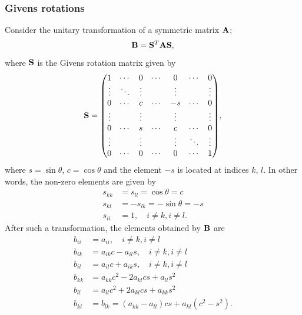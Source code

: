 \documentclass[notitlepage, reprint, nofootinbib]{revtex4-1}
\begin{document}
\subsubsection{Givens rotations}\label{givens}
Consider the unitary transformation of a symmetric matrix $\vb{A}$;
\begin{equation} \label{rotation}\vb{B}=\vb{S}^T\vb{AS},\end{equation}
where $\vb{S}$ is the Givens rotation matrix given by 
\begin{equation}\label{givens_mat} \vb{S}=\mqty( 1&\cdots &0&\cdots &0&\cdots&0\\ \vdots &\ddots & \vdots & &\vdots&&\vdots \\ 0&\cdots&c&\cdots&-s&\cdots&0\\ \vdots &&\vdots&&\vdots&&\vdots\\0&\cdots&s&\cdots&c&\cdots&0\\ \vdots &&\vdots&&\vdots&\ddots&\vdots\\0&\cdots&0&\cdots&0&\cdots&1),\end{equation}
where $s=\sin\theta$, $c=\cos\theta$ and the element $-s$ is located at indices $k$, $l$. In other words, the non-zero elements are given by
\begin{align*}
	s_{kk}&=s_{ll}=\cos\theta=c \\
	s_{kl}&=-s_{lk}=-\sin\theta=-s\\
	s_{ii}&=1,\quad i\neq k, i\neq l.
\end{align*}
After such a transformation, the elements obtained by $\vb{B}$ are 
\begin{align}
	b_{ii}&=a_{ii},\quad i\neq k, i\neq l\nonumber \\
	b_{ik}&=a_{ik}c-a_{il}s,\quad i\neq k, i\neq l\nonumber \\
	b_{il}&=a_{il}c+a_{ik}s,\quad i\neq k, i\neq l\nonumber \\
	b_{kk}&=a_{kk}c^2-2a_{kl}cs+a_{ll}s^2\nonumber \\
	b_{ll}&=a_{ll}c^2+2a_{kl}cs+a_{kk}s^2\nonumber \\
	b_{kl}&=b_{lk}=(a_{kk}-a_{ll})cs+a_{kl}(c^2-s^2).\label{long_thing}
\end{align}

\newpage
\end{document}
